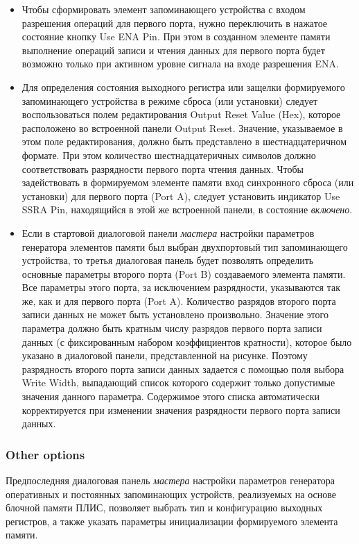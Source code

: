 \begin{itemize}
\item Чтобы сформировать элемент запоминающего устройства с входом разрешения операций для первого порта, нужно переключить в нажатое состояние кнопку Use ENA Pin. При этом в созданном элементе памяти выполнение операций записи и чтения данных для первого порта будет возможно только при активном уровне сигнала на входе разрешения ENA.
\item Для определения состояния выходного регистра или защелки формируемого запоминающего устройства в режиме сброса (или установки) следует воспользоваться полем редактирования Output Reset Value (Hex), которое расположено во встроенной панели Output Reset. Значение, указываемое в этом поле редактирования, должно быть представлено в шестнадцатеричном формате. При этом количество шестнадцатеричных символов должно соответствовать разрядности первого порта чтения данных. Чтобы задействовать в формируемом элементе памяти вход синхронного сброса (или установки) для первого порта (Port A), следует установить индикатор Use SSRA Pin, находящийся в этой же встроенной панели, в состояние \emph {включено}. 
\item Если в стартовой диалоговой панели \emph {мастера} настройки параметров генератора элементов памяти был выбран двухпортовый тип запоминающего устройства, то третья диалоговая панель будет позволять определить основные параметры второго порта (Port B) создаваемого элемента памяти. Все параметры этого порта, за исключением разрядности, указываются так же, как и для первого порта (Port A). Количество разрядов второго порта записи данных не может быть установлено произвольно. Значение этого параметра должно быть кратным числу разрядов первого порта записи данных (с фиксированным набором коэффициентов кратности), которое было указано в диалоговой панели, представленной на рисунке. Поэтому разрядность второго порта записи данных задается с помощью поля выбора Write Width, выпадающий список которого содержит только допустимые значения данного параметра. Содержимое этого списка автоматически корректируется при изменении значения разрядности первого порта записи данных. 
\end{itemize}

\subsubsection{Other options}

Предпоследняя диалоговая панель \emph {мастера} настройки параметров генератора оперативных и постоянных запоминающих устройств, реализуемых на основе блочной памяти ПЛИС, позволяет выбрать тип и конфигурацию выходных регистров, а также указать параметры инициализации формируемого элемента памяти. 

